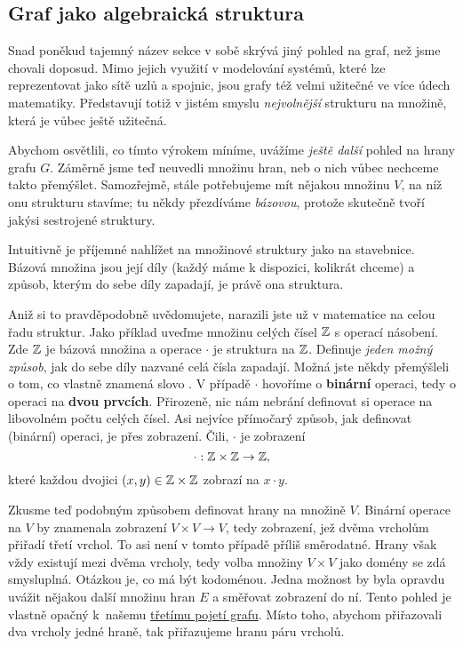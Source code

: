 \subsection{Graf jako algebraická struktura}
\label{ssec:graf-jako-algebraicka-struktura}

Snad poněkud tajemný název sekce v sobě skrývá jiný pohled na graf, než jsme
chovali doposud. Mimo jejich využití v modelování systémů, které lze
reprezentovat jako sítě uzlů a spojnic, jsou grafy též velmi užitečné ve více
 údech matematiky. Představují totiž v jistém smyslu
\emph{nejvolnější} strukturu na množině, která je vůbec ještě užitečná.

Abychom osvětlili, co tímto výrokem míníme, uvážíme \emph{ještě další} pohled na
hrany grafu $G$. Záměrně jsme teď neuvedli množinu hran, neb o nich vůbec
nechceme takto přemýšlet. Samozřejmě, stále potřebujeme mít nějakou množinu $V$,
na níž onu strukturu stavíme; tu někdy přezdíváme \emph{bázovou}, protože
skutečně tvoří jakýsi  sestrojené struktury.

Intuitivně je příjemné nahlížet na množinové struktury jako na stavebnice.
Bázová množina jsou její díly (každý máme k dispozici, kolikrát chce\-me) a
způsob, kterým do sebe díly zapadají, je právě ona struktura.

Aniž si to pravděpodobně uvědomujete, narazili jste už v matematice na celou
řadu struktur. Jako příklad uveďme množinu celých čísel $\mathbb{Z}$ s operací
násobení. Zde $\mathbb{Z}$ je bázová množina a operace $ \cdot $ je struktura na $\mathbb{Z}$.
Definuje \emph{jeden možný způsob}, jak do sebe díly nazvané celá čísla
zapadají. Možná jste někdy přemýšleli o tom, co vlastně znamená slovo
. V případě $ \cdot $ hovoříme o \textbf{binární} operaci, tedy o
operaci na \textbf{dvou prvcích}. Přirozeně, nic nám nebrání definovat si
operace na libovolném počtu celých čísel. Asi nejvíce přímočarý způsob, jak
definovat (binární) operaci, je přes zobrazení. Čili, $ \cdot $ je zobrazení
\[
 \cdot :\mathbb{Z} \times \mathbb{Z} \to \mathbb{Z},
\]
které každou dvojici $(x,y) \in \mathbb{Z} \times \mathbb{Z}$ zobrazí na $x \cdot y$.

Zkusme teď podobným způsobem definovat hrany na množině $V$. Binární operace na
$V$ by znamenala zobrazení $V \times V \to V$, tedy zobrazení, jež dvěma
vrcholům přiřadí třetí vrchol. To asi není v tomto případě příliš směrodatné.
Hrany však vždy existují mezi dvěma vrcholy, tedy volba množiny $V \times V$
jako domény se zdá smysluplná. Otázkou je, co má být kodoménou. Jedna možnost by
byla opravdu uvážit nějakou další množinu hran $E$ a směřovat zobrazení do ní.
Tento pohled je vlastně opačný k~našemu \hyperref[def:graf-potreti]{třetímu
pojetí grafu}. Místo toho, abychom přiřazovali dva vrcholy jedné hraně, tak
přiřazujeme hranu páru vrcholů.

